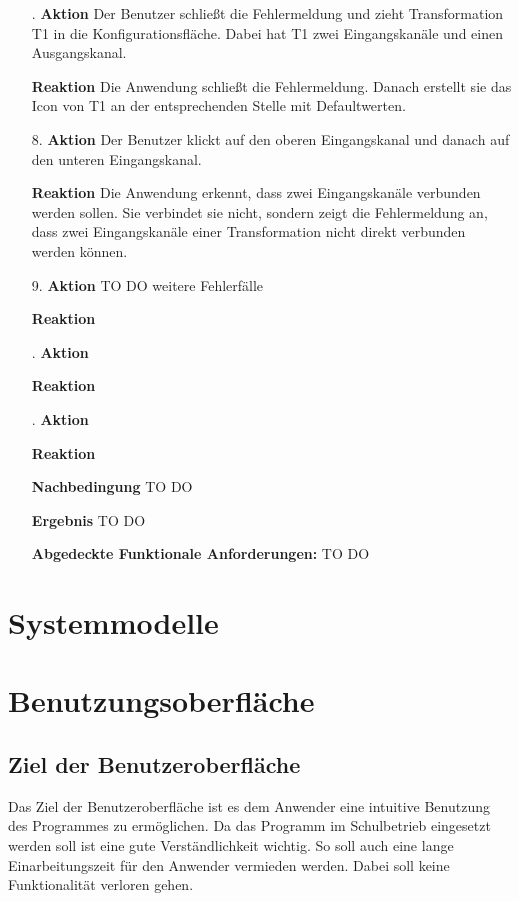 \documentclass[parskip=full]{scrartcl}
\begin{document}
\begin{itemize}
\begin{itemize}
\item [.]\textbf{Aktion} Der Benutzer schließt die Fehlermeldung und zieht Transformation T1 in die Konfigurationsfläche. Dabei hat T1 zwei Eingangskanäle und einen Ausgangskanal.
\item []\textbf{Reaktion} Die Anwendung schließt die Fehlermeldung. Danach erstellt sie das Icon von T1 an der entsprechenden Stelle mit Defaultwerten.
\item [8.]\textbf{Aktion} Der Benutzer klickt auf den oberen Eingangskanal und danach auf den unteren Eingangskanal.
\item []\textbf{Reaktion} Die Anwendung erkennt, dass zwei Eingangskanäle verbunden werden sollen. Sie verbindet sie nicht, sondern zeigt die Fehlermeldung an, dass zwei Eingangskanäle einer Transformation nicht direkt verbunden werden können.
\item [9.]\textbf{Aktion} TO DO weitere Fehlerfälle
\item []\textbf{Reaktion}
\item [.]\textbf{Aktion} 
\item []\textbf{Reaktion}
\item [.]\textbf{Aktion} 
\item []\textbf{Reaktion}

\item []\textbf{Nachbedingung} TO DO
\item []\textbf{Ergebnis} TO DO

\item []\textbf{Abgedeckte Funktionale Anforderungen:} TO DO

\end{itemize}


\end{itemize}

\section{Systemmodelle}

\section{Benutzungsoberfläche}

\subsection{Ziel der Benutzeroberfläche}

Das Ziel der Benutzeroberfläche ist es dem Anwender eine intuitive Benutzung des Programmes zu ermöglichen. Da das Programm im Schulbetrieb eingesetzt werden soll ist eine gute Verständlichkeit wichtig. So soll auch eine lange Einarbeitungszeit für den Anwender vermieden werden. Dabei soll keine Funktionalität verloren gehen.
\end{document}

